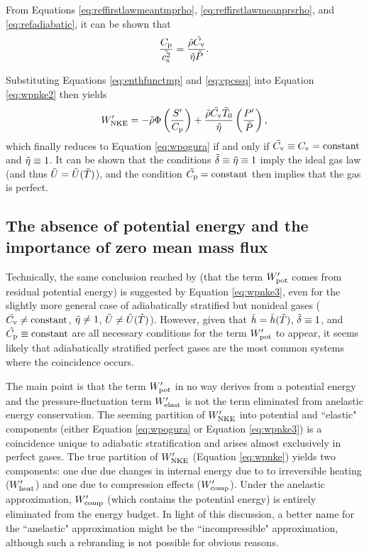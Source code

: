\documentclass[12pt]{article}
\newcommand{\wpnke}{W^\prime_{\rm NKE}}
\newcommand{\wpheat}{W^\prime_{\rm heat}}
\newcommand{\wpcomp}{W^\prime_{\rm comp}}
\newcommand{\wppot}{W^\prime_{\rm pot}}
\newcommand{\wpelast}{W^\prime_{\rm elast}}
\begin{document}
From Equations \eqref{eq:reffirstlawmeantmprho}, \eqref{eq:reffirstlawmeanprsrho}, and \eqref{eq:refadiabatic}, it can be shown that
\begin{align}\label{eq:cpcssq}
	\frac{C_{\rm{p}}}{\tilde{c_{\rm s}^2}} = \frac{\tilde{\rho}\tilde{C_{\rm{v}}}}{\tilde{\eta}\tilde{P}}.
\end{align}

Substituting Equations \eqref{eq:enthfunctmp} and \eqref{eq:cpcssq} into Equation \eqref{eq:wpnke2} then yields
\begin{align}\label{eq:wpnke3}
	\wpnke =-\rhotilde\Phi\left(\frac{\entrprime}{\cpcap}\right) + \frac{\rhotilde\cvtilde\tmptilde_0}{\etatilde}\left(\frac{\prsprime}{\prstilde}\right),
\end{align}
which finally reduces to Equation \eqref{eq:wpogura} if and only if $\tilde{C_{\rm{v}}}\equiv C_{\rm{v}}=\text{constant}$ and $\tilde{\eta}\equiv1$. It can be shown that the conditions $\tilde{\delta}\equiv\tilde{\eta}\equiv1$ imply the ideal gas law (and thus $\tilde{U}=\tilde{U}(\tilde{T})$), and the condition $\tilde{C_{\rm{p}}}=\text{constant}$ then implies that the gas is perfect.

\subsection{The absence of potential energy and the importance of zero mean mass flux}
Technically, the same conclusion reached by \citet{Ogura1962} (that the term $\wppot$ comes from residual potential energy) is suggested by Equation \eqref{eq:wpnke3}, even for the slightly more general case of adiabatically stratified but nonideal gases ($\tilde{C_{\rm{v}}}\neq\text{constant}$, $\tilde{\eta}\neq1$, $\tilde{U}\neq\tilde{U}(\tilde{T})$). However, given that $\tilde{h}=\tilde{h}(\tilde{T})$, $\tilde{\delta}\equiv1$, and $\tilde{C_{\rm{p}}}\equiv\text{constant}$ are all necessary conditions for the term $\wppot$ to appear, it seems likely that adiabatically stratified perfect gases are the most common systems where the coincidence occurs. 

The main point is that the term $\wppot$ in no way derives from a potential energy and the pressure-fluctuation term $\wpelast$ is not the term eliminated from anelastic energy conservation. The seeming partition of $\wpnke$ into potential and ``elastic" components (either Equation \eqref{eq:wpogura} or Equation \eqref{eq:wpnke3}) is a coincidence unique to adiabatic stratification and arises almost exclusively in perfect gases. The true partition of $\wpnke$ (Equation \eqref{eq:wpnke}) yields two components: one due due changes in internal energy due to to irreversible heating ($\wpheat$) and one due to compression effects ($\wpcomp$). Under the anelastic approximation, $\wpcomp$ (which contains the potential energy) is entirely eliminated from the energy budget. In light of this discussion, a better name for the ``anelastic" approximation might be the ``incompressible" approximation, although such a rebranding is not possible for obvious reasons. 
\end{document}
